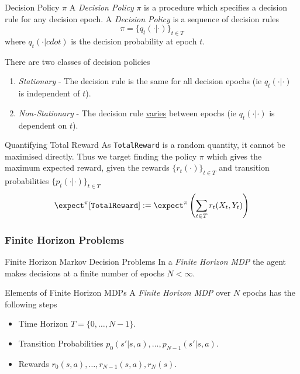 \documentclass[11pt,a4paper]{article}
\begin{document}
  \begin{definition}{Decision Policy $\pi$}
    A \textit{Decision Policy} $\pi$ is a procedure which specifies a decision rule for any decision epoch. A \textit{Decision Policy} is a sequence of decision rules
    \[ \pi=\{q_t(\cdot|\cdot)\}_{t\in T} \]
    where $q_t(\cdot|cdot)$ is the decision probability at epoch $t$.
    \par There are two classes of decision policies
    \begin{enumerate}
      \item \textit{Stationary} - The decision rule is the same for all decision epochs (ie $q_t(\cdot|\cdot)$ is independent of $t$).
      \item \textit{Non-Stationary} - The decision rule \underline{varies} between epochs (ie $q_t(\cdot|\cdot)$ is dependent on $t$).
    \end{enumerate}
  \end{definition}

  \begin{remark}{Quantifying Total Reward}
    As \texttt{TotalReward} is a random quantity, it cannot be maximised directly. Thus we target finding the policy $\pi$ which gives the maximum expected reward, given the rewards $\{r_t(\cdot)\}_{t\in T}$ and transition probabilities $\{p_t(\cdot|\cdot)\}_{t\in T}$
    \[ \expect^\pi[\mathtt{TotalReward}]:=\expect^\pi\left(\sum_{t\in T}r_t(X_t,Y_t)\right) \]

  \end{remark}

\subsubsection{Finite Horizon Problems}

  \begin{definition}{Finite Horizon Markov Decision Problems}
    In a \textit{Finite Horizon MDP} the agent makes decisions at a finite number of epochs $N<\infty$.
  \end{definition}

  \begin{proposition}{Elements of Finite Horizon MDPs}
    A \textit{Finite Horizon MDP} over $N$ epochs has the following steps
    \begin{itemize}
      \item Time Horizon $T=\{0,\dots,N-1\}$.
      \item Transition Probabilities $p_0(s'|s,a),\dots,p_{N-1}(s'|s,a)$.
      \item Rewards $r_0(s,a),\dots,r_{N-1}(s,a),r_N(s)$.
    \end{itemize}
  \end{proposition}
\end{document}
